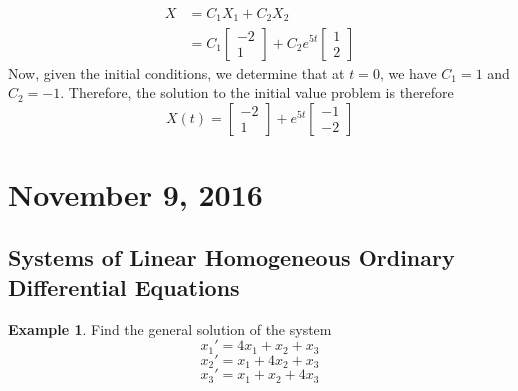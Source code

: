 \documentclass[11pt]{article}
\theoremstyle{plain} %
\theoremstyle{definition}
\theoremstyle{example}
\newtheorem*{example}{Example}
\theoremstyle{remark}
\begin{document}
\begin{align*}X &= C_1X_1 + C_2X_2\\
&=C_1\begin{bmatrix}-2 \\ 1\end{bmatrix} + C_2e^{5t}\begin{bmatrix}1 \\ 2\end{bmatrix}
\end{align*}
Now, given the initial conditions, we determine that at $t=0$, we have $C_1 = 1$ and $C_2 = -1$. Therefore, the solution to the initial value problem is therefore $$X(t) = \begin{bmatrix}-2 \\ 1\end{bmatrix} + e^{5t}\begin{bmatrix}-1 \\ -2\end{bmatrix}$$


\section{November 9, 2016}
\subsection{Systems of Linear Homogeneous Ordinary Differential Equations}

\begin{example}
Find the general solution of the system $$x_1' = 4x_1+x_2+x_3$$
$$x_2' = x_1 + 4x_2 + x_3$$
$$x_3' = x_1 + x_2 + 4x_3$$
\end{example}
\end{document}
